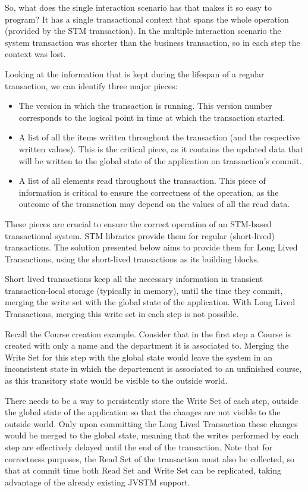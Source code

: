\documentclass{llncs}
\begin{document}
So, what does the single interaction scenario has that makes it so
easy to program? It has a single transactional context that spans the
whole operation (provided by the STM transaction). In the multiple
interaction scenario the system transaction was shorter than the
business transaction, so in each step the context was lost.

Looking at the information that is kept during the lifespan of a
regular transaction, we can identify three major pieces:

\begin{itemize}
\item The version in which the transaction is running. This version
  number corresponds to the logical point in time at which the
  transaction started.
\item A list of all the items written throughout the transaction (and
  the respective written values). This is the critical piece, as it
  contains the updated data that will be written to the global state
  of the application on transaction's commit.
\item A list of all elements read throughout the transaction. This
  piece of information is critical to ensure the correctness of the
  operation, as the outcome of the transaction may depend on the
  values of all the read data.
\end{itemize}

These pieces are crucial to ensure the correct operation of an
STM-based transactional system. STM libraries provide them for regular
(short-lived) transactions. The solution presented below aims to
provide them for Long Lived Transactions, using the short-lived
transactions as its building blocks.

Short lived transactions keep all the necessary information in
transient transaction-local storage (typically in memory), until the
time they commit, merging the write set with the global state of the
application. With Long Lived Transactions, merging this write set in
each step is not possible.

Recall the Course creation example. Consider that in the first step a
Course is created with only a name and the department it is associated
to. Merging the Write Set for this step with the global state would
leave the system in an inconsistent state in which the departement is
associated to an unfinished course, as this transitory state would be
visible to the outside world.

There needs to be a way to persistently store the Write Set of each
step, outside the global state of the application so that the changes
are not visible to the outside world. Only upon committing the Long
Lived Transaction these changes would be merged to the global state,
meaning that the writes performed by each step are effectively delayed
until the end of the transaction. Note that for correctness purposes,
the Read Set of the transaction must also be collected, so that at
commit time both Read Set and Write Set can be replicated, taking
advantage of the already existing JVSTM support.
\end{document}
